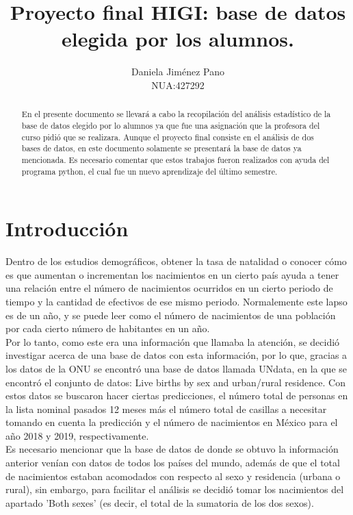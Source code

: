 \documentclass{article}
\title{Proyecto final HIGI: base de datos elegida por los alumnos.}
\author{Daniela Jiménez Pano \\ NUA:427292}
\begin{document}
\maketitle

\begin{abstract}

\noindent En el presente documento se llevará a cabo la recopilación del análisis estadístico de la base de datos elegido por lo alumnos ya que fue una asignación que la profesora del curso pidió que se realizara. Aunque el proyecto final consiste en el análisis de dos bases de datos, en este documento solamente se presentará la base de datos ya mencionada. Es necesario comentar que estos trabajos fueron realizados con ayuda del programa python, el cual fue un nuevo aprendizaje del último semestre. 
\end{abstract}

\section{Introducción}

Dentro de los estudios demográficos, obtener la tasa de natalidad o conocer cómo es que aumentan o incrementan los nacimientos en un cierto país ayuda a tener una relación entre el número de nacimientos ocurridos en un cierto periodo de tiempo y la cantidad de efectivos de ese mismo periodo. Normalemente este lapso es de un año, y se puede leer como el número de nacimientos de una población por cada cierto número de habitantes en un año. \cite{Eustat:Online} \\
Por lo tanto, como este era una información que llamaba la atención, se decidió investigar acerca de una base de datos con esta información, por lo que, gracias a los datos de la ONU se encontró una base de datos llamada UNdata, en la que se encontró el conjunto de datos: Live births by sex and urban/rural residence.\cite{UNdata:Online}  Con estos datos se buscaron hacer ciertas predicciones, el número total de personas en la lista nominal pasados 12 meses más el número total de casillas a necesitar tomando en cuenta la predicción y el número de nacimientos en México para el año 2018 y 2019, respectivamente.\\

\noindent Es necesario mencionar que la base de datos de donde se obtuvo la información anterior venían con datos de todos los países del mundo, además de que el total de nacimientos estaban acomodados con respecto al sexo y residencia (urbana o rural), sin embargo, para facilitar el análisis se decidió tomar los nacimientos del apartado 'Both sexes' (es decir, el total de la sumatoria de los dos sexos). \\
\end{document}
